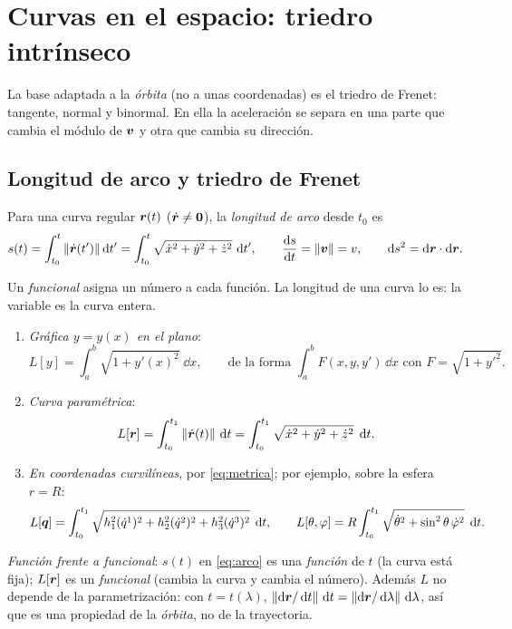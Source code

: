 \section{Curvas en el espacio: triedro intrínseco}
\label{sec:frenet}

La base adaptada a la \emph{órbita} (no a unas coordenadas) es el triedro de
Frenet: tangente, normal y binormal. En ella la aceleración se separa en una
parte que cambia el módulo de $\bm{v}$ y otra que cambia su dirección.

\subsection{Longitud de arco y triedro de Frenet}

\begin{definicion}
\label{def:arco}
Para una curva regular $\bm{r}(t)$ ($\dot{\bm{r}}\neq\bm{0}$), la
\emph{longitud de arco} desde $t_{0}$ es
\begin{equation}
  s(t)=\int_{t_{0}}^{t}\left\lVert \dot{\bm{r}}(t')\right\rVert\mathop{}\!\mathrm{d} t'
      =\int_{t_{0}}^{t}\sqrt{\dot x^{2}+\dot y^{2}+\dot z^{2}}\,\mathop{}\!\mathrm{d} t',
  \qquad \frac{\mathop{}\!\mathrm{d} s}{\mathop{}\!\mathrm{d} t}=\left\lVert \bm{v}\right\rVert=v,\qquad \mathop{}\!\mathrm{d} s^{2}=\mathop{}\!\mathrm{d}\bm{r}\cdot\mathop{}\!\mathrm{d}\bm{r}.
  \label{eq:arco}
\end{equation}
\end{definicion}

\begin{observacion}
Un \emph{funcional} asigna un número a cada función. La longitud de una curva
lo es: la variable es la curva entera.
\begin{enumerate}
  \item \emph{Gráfica $y=y(x)$ en el plano}:
  \[
    L[y]=\int_{a}^{b}\sqrt{1+y'(x)^{2}}\;\dd x,
    \qquad\text{de la forma } \int_{a}^{b}F(x,y,y')\,\dd x \text{ con } F=\sqrt{1+y'^{2}}.
  \]
  \item \emph{Curva paramétrica}:
  \[
    L[\bm{r}]=\int_{t_{0}}^{t_{1}}\left\lVert \dot{\bm{r}}(t)\right\rVert\,\mathop{}\!\mathrm{d} t
    =\int_{t_{0}}^{t_{1}}\sqrt{\dot x^{2}+\dot y^{2}+\dot z^{2}}\;\mathop{}\!\mathrm{d} t .
  \]
  \item \emph{En coordenadas curvilíneas}, por \eqref{eq:metrica}; por ejemplo, sobre la esfera $r=R$:
  \[
    L[\bm{q}]=\int_{t_{0}}^{t_{1}}\sqrt{h_{1}^{2}(\dot q^{1})^{2}+h_{2}^{2}(\dot q^{2})^{2}+h_{3}^{2}(\dot q^{3})^{2}}\;\mathop{}\!\mathrm{d} t,
    \qquad
    L[\theta,\varphi]=R\int_{t_{0}}^{t_{1}}\sqrt{\dot\theta^{2}+\sin^{2}\theta\,\dot\varphi^{2}}\;\mathop{}\!\mathrm{d} t .
  \]
\end{enumerate}
\emph{Función frente a funcional}: $s(t)$ en \eqref{eq:arco} es una
\emph{función} de $t$ (la curva está fija); $L[\bm{r}]$ es un \emph{funcional}
(cambia la curva y cambia el número). Además $L$ no depende de la
parametrización: con $t=t(\lambda)$,
$\left\lVert \mathop{}\!\mathrm{d}\bm{r}/\mathop{}\!\mathrm{d} t\right\rVert\,\mathop{}\!\mathrm{d} t=\left\lVert \mathop{}\!\mathrm{d}\bm{r}/\mathop{}\!\mathrm{d}\lambda\right\rVert\,\mathop{}\!\mathrm{d}\lambda$, así que es una
propiedad de la \emph{órbita}, no de la trayectoria.
\end{observacion}

